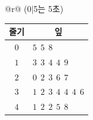 {\renewcommand{\arraystretch}{1.25}\small
\begin{tabular}{@{}r@{}}
{\footnotesize (0$|$5는 5초)} \\[1pt]
\begin{tabular}{c|@{\ \ }l}
\hline
줄기 & \multicolumn{1}{c}{잎} \\ \hline
$0$ & $5\ \ 5\ \ 8$ \\
$1$ & $3\ \ 3\ \ 4\ \ 4\ \ 9$ \\
$2$ & $0\ \ 2\ \ 3\ \ 6\ \ 7$ \\
$3$ & $1\ \ 2\ \ 3\ \ 4\ \ 4\ \ 4\ \ 6$ \\
$4$ & $1\ \ 2\ \ 2\ \ 5\ \ 8$ \\ \hline
\end{tabular}
\end{tabular}}
